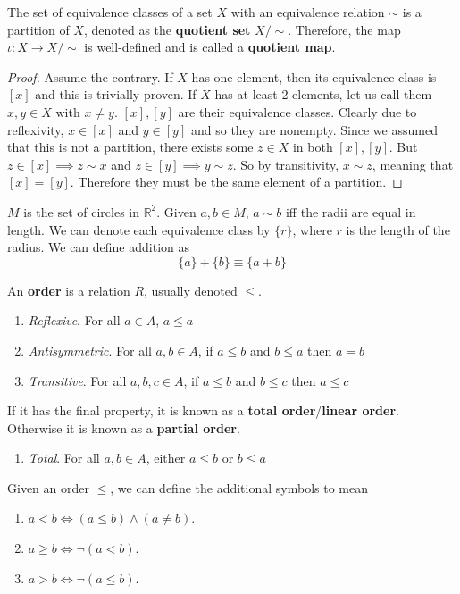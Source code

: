   \begin{theorem}
    The set of equivalence classes of a set $X$ with an equivalence relation $\sim$ is a partition of $X$, denoted as the \textbf{quotient set} $X/\sim$. Therefore, the map $\iota: X \rightarrow X/\sim$ is well-defined and is called a \textbf{quotient map}. 
  \end{theorem} 
  \begin{proof}
    Assume the contrary. If $X$ has one element, then its equivalence class is $[x]$ and this is trivially proven. If $X$ has at least 2 elements, let us call them $x, y \in X$ with $x \neq y$. $[x], [y]$ are their equivalence classes. Clearly due to reflexivity, $x \in [x]$ and $y \in [y]$ and so they are nonempty. Since we assumed that this is not a partition, there exists some $z \in X$ in both $[x], [y]$. But $z \in [x] \implies z \sim x$ and $z \in [y] \implies y \sim z$. So by transitivity, $x \sim z$, meaning that $[x] = [y]$. Therefore they must be the same element of a partition. 
  \end{proof}

  \begin{example}[Circles]
    $M$ is the set of circles in $\mathbb{R}^{2}$. Given $a, b \in M$, $a \sim b$ iff the radii are equal in length. We can denote each equivalence class by $\{ r \}$, where $r$ is the length of the radius. We can define addition as 
    \begin{equation}
      \{ a \} + \{ b \} \equiv \{ a + b\}
    \end{equation}
  \end{example}

  \begin{definition}[Order]
    An \textbf{order} is a relation $R$, usually denoted $\leq$. 
    \begin{enumerate}
      \item \textit{Reflexive}. For all $a \in A$, $a \leq a$
      \item \textit{Antisymmetric}. For all $a,b \in A$, if $a \leq b$ and $b \leq a$ then $a=b$
      \item \textit{Transitive}. For all $a,b,c \in A$, if $a \leq b$ and $b \leq c$ then $a \leq c$
    \end{enumerate} 
    If it has the final property, it is known as a \textbf{total order}/\textbf{linear order}. Otherwise it is known as a \textbf{partial order}. 
    \begin{enumerate}
      \item \textit{Total}. For all $a,b \in A$, either $a \leq b$ or $b \leq a$
    \end{enumerate} 
    Given an order $\leq$, we can define the additional symbols to mean 
    \begin{enumerate}
      \item $a < b \iff (a \leq b) \land (a \neq b)$. 
      \item $a \geq b \iff \neg(a < b)$. 
      \item $a > b \iff \neg(a \leq b)$. 
    \end{enumerate} 
  \end{definition} 

